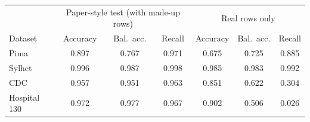 ﻿\begin{tabular}{lcccccc}
\toprule & \multicolumn{3}{c}{Paper-style test (with made-up rows)} & \multicolumn{3}{c}{Real rows only}\\
Dataset & Accuracy & Bal.\ acc. & Recall & Accuracy & Bal.\ acc. & Recall\\\midrule
Pima & 0.897 & 0.767 & 0.971 & 0.675 & 0.725 & 0.885\\
Sylhet & 0.996 & 0.987 & 0.998 & 0.985 & 0.983 & 0.992\\
CDC & 0.957 & 0.951 & 0.963 & 0.851 & 0.622 & 0.304\\
Hospital 130 & 0.972 & 0.977 & 0.967 & 0.902 & 0.506 & 0.026\\
\bottomrule\end{tabular}
